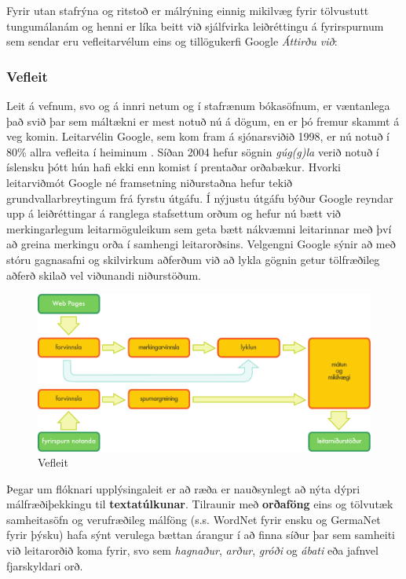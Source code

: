 \documentclass{../../metanetpaper}
\begin{document}
\begin{multicols}{2}
Fyrir utan stafrýna og ritstoð er málrýning einnig mikilvæg fyrir tölvustutt tungumálanám og henni er líka beitt við sjálfvirka leiðréttingu á fyrirspurnum sem sendar eru vefleitarvélum eins og tillögukerfi Google \textit{Áttirðu við}:

\subsubsection{Vefleit}

Leit á vefnum, svo og á innri netum og í stafrænum bókasöfnum, er væntanlega það svið þar sem máltækni er mest notuð nú á dögum, en er þó fremur skammt á veg komin. Leitarvélin Google, sem kom fram á sjónarsviðið 1998, er nú notuð í 80\% allra vefleita í heiminum \cite{spi1}.  Síðan 2004 hefur sögnin  \textit{gúg(g)la} verið notuð í íslensku þótt hún hafi ekki enn komist í prentaðar orðabækur. Hvorki leitarviðmót Google né framsetning niðurstaðna hefur tekið grundvallarbreytingum frá fyrstu útgáfu. Í nýjustu útgáfu býður Google reyndar upp á leiðréttingar á ranglega stafsettum orðum og hefur nú bætt við merkingarlegum leitarmöguleikum sem geta bætt nákvæmni leitarinnar með því að greina merkingu orða í samhengi leitarorðsins\cite{pc1}.  Velgengni Google sýnir að með stóru gagnasafni og skilvirkum aðferðum við að lykla gögnin getur tölfræðileg aðferð skilað vel viðunandi niðurstöðum.

\begin{figure}[htb]
  \center
  \includegraphics[width=\textwidth]{../_media/icelandic/web_search_architecture}
  \caption{Vefleit}
  \label{fig:websearcharch_is}
\end{figure}

Þegar um flóknari upplýsingaleit er að ræða er nauðsynlegt að nýta dýpri málfræðiþekkingu til \textbf{textatúlkunar}. Tilraunir með \textbf{orðaföng} eins og tölvutæk samheitasöfn og verufræðileg málföng (s.s. WordNet fyrir ensku og GermaNet fyrir þýsku) hafa sýnt verulega bættan árangur í að finna síður þar sem samheiti við leitarorðið koma fyrir, svo sem  \textit{hagnaður}, \textit{arður}, \textit{gróði} og  \textit{ábati} eða jafnvel fjarskyldari orð.


\end{multicols}
\end{document}
